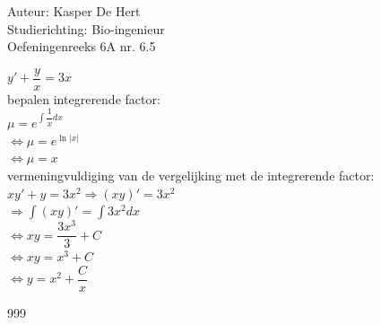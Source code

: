 \documentclass[a4paper]{article}
\begin{document}
\noindent \large Auteur: Kasper De Hert \\
\noindent \large Studierichting: Bio-ingenieur \\
\noindent \large Oefeningenreeks 6A nr. 6.5\\

\medskip

\normalsize

$y' + \dfrac{y}{x} = 3x$\\

bepalen integrerende factor:\\

$\mu = e^{\displaystyle\int \dfrac{1}{x}dx}$\\

$\Leftrightarrow \mu = e^{\ln|x|}$\\

$\Leftrightarrow \mu = x$\\

vermeningvuldiging van de vergelijking met de integrerende factor:\\

$xy' + y = 3x^2 \Rightarrow (xy)' = 3x^2$\\

$\Rightarrow \displaystyle\int (xy)' = \displaystyle\int 3x^2 dx$\\

$\Leftrightarrow xy = \dfrac{3x^3}{3} + C$\\

$\Leftrightarrow xy = x^3 + C$\\

$\Leftrightarrow y = x^2 + \dfrac{C}{x}$\\


\begin{thebibliography}{999}
\end{thebibliography}
\end{document}
